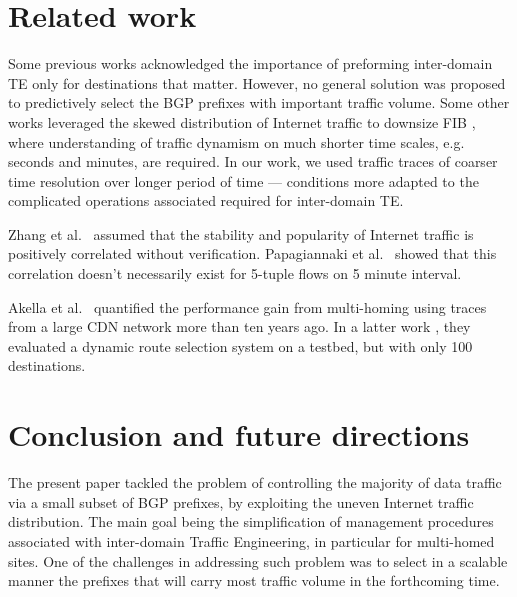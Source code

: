 \documentclass[10pt, conference,letterpaper]{IEEEtran}
\begin{document}
\section{Related work}
\label{sec:bg}
Some previous works \cite{Feamster2003, Akella2008, Goldenberg2004} acknowledged the importance of preforming inter-domain TE only for destinations that matter.
However, no general solution was proposed to predictively select the BGP prefixes with important traffic volume.
Some other works leveraged the skewed distribution of Internet traffic to downsize FIB \cite{Iannone2007, Ballani2009, Kim2009, Zhang2012, Sarrar2012, Liu2015}, where understanding of traffic dynamism on much shorter time scales, e.g. seconds and minutes, are required. 
In our work, we used traffic traces of coarser time resolution over longer period of time --- conditions more adapted to the complicated operations associated required for inter-domain TE.



Zhang et al.\ \cite{Zhang2012} assumed that the stability and popularity of Internet traffic is positively correlated without verification. 
Papagiannaki et al.\ \cite{Papagiannaki2004} showed that this correlation doesn't necessarily exist for 5-tuple flows on 5 minute interval. 




Akella et al.\ \cite{Akella2003a} quantified the performance gain from multi-homing using traces from a large CDN network more than ten years ago. 
In a latter work \cite{Akella2008}, they evaluated a dynamic route selection system on a testbed, but with only 100 destinations. 




\section{Conclusion and future directions}
\label{sec:fut}
The present paper tackled the problem of controlling the majority of data traffic via 
a small subset of BGP prefixes, by exploiting the uneven Internet traffic distribution. 
The main goal being the simplification of management procedures associated with inter-domain Traffic Engineering, in particular for multi-homed sites.  
One of the challenges in addressing such problem was to select in a scalable manner the prefixes that will carry most traffic volume in the forthcoming time.  
\end{document}
